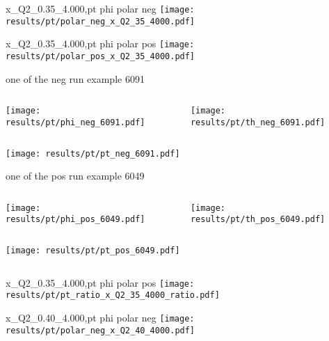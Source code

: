 \begin{frame}{x\_Q2\_0.35\_4.000,pt phi polar neg}
\texttt{[image: results/pt/polar\_neg\_x\_Q2\_35\_4000.pdf]}
\end{frame}
\begin{frame}{x\_Q2\_0.35\_4.000,pt phi polar pos}
\texttt{[image: results/pt/polar\_pos\_x\_Q2\_35\_4000.pdf]}
\end{frame}
\begin{frame}{one of the neg run example 6091}
\begin{columns}
\begin{column}[T]{0.5\textwidth}
\texttt{[image: results/pt/phi\_neg\_6091.pdf]}
\end{column}
\begin{column}[T]{0.5\textwidth}
\texttt{[image: results/pt/th\_neg\_6091.pdf]}
\end{column}
\end{columns}
\texttt{[image: results/pt/pt\_neg\_6091.pdf]}
\end{frame}
\begin{frame}{one of the pos run example 6049}
\begin{columns}
\begin{column}[T]{0.5\textwidth}
\texttt{[image: results/pt/phi\_pos\_6049.pdf]}
\end{column}
\begin{column}[T]{0.5\textwidth}
\texttt{[image: results/pt/th\_pos\_6049.pdf]}
\end{column}
\end{columns}
\begin{columns}
\begin{column}[T]{0.5\textwidth}
\texttt{[image: results/pt/pt\_pos\_6049.pdf]}
\end{column}
\begin{column}[T]{0.5\textwidth}
\end{column}
\end{columns}
\end{frame}
\begin{frame}{x\_Q2\_0.35\_4.000,pt phi polar pos}
\texttt{[image: results/pt/pt\_ratio\_x\_Q2\_35\_4000\_ratio.pdf]}
\end{frame}
\begin{frame}{x\_Q2\_0.40\_4.000,pt phi polar neg}
\texttt{[image: results/pt/polar\_neg\_x\_Q2\_40\_4000.pdf]}
\end{frame}
